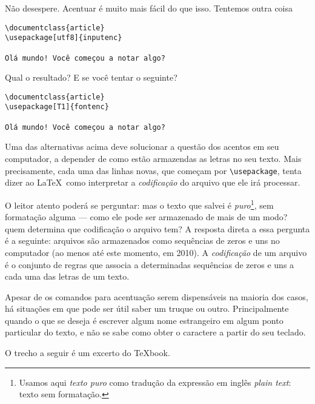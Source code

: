 Não desespere. Acentuar é muito mais fácil do que isso. Tentemos outra
coisa

\begin{footnotesize}
\begin{verbatim}
\documentclass{article}
\usepackage[utf8]{inputenc}

Olá mundo! Você começou a notar algo?

\end{verbatim}
\end{footnotesize}

Qual o resultado? E se você tentar o seguinte?
\begin{footnotesize}
\begin{verbatim}
\documentclass{article}
\usepackage[T1]{fontenc}

Olá mundo! Você começou a notar algo?

\end{verbatim}
\end{footnotesize}

Uma das alternativas acima deve solucionar a questão dos acentos em
seu computador, a depender de como estão armazendas as letras no
seu texto. Mais precisamente, cada uma das linhas novas, que começam
por \verb'\usepackage', tenta dizer ao \LaTeX\ como interpretar a
\emph{codificação} do arquivo que ele irá processar.

\begin{detalhe}
O leitor atento poderá se perguntar: mas o texto que salvei é
\emph{puro}\footnote{Usamos aqui \emph{texto puro} como tradução da
  expressão em inglês \emph{plain text}: texto sem formatação.}, sem
formatação alguma --- como ele pode ser armazenado de mais de um modo?
quem determina que codificação o arquivo tem? 
A resposta direta a essa pergunta é a seguinte: arquivos são
armazenados como sequências de zeros e uns no computador (ao menos até
este momento, em 2010). A \emph{codificação} de um arquivo é o
conjunto de regras que associa a determinadas sequências de zeros e
uns a cada uma das letras de um texto.
\end{detalhe}

Apesar de os comandos para acentuação serem dispensáveis na maioria
dos casos, há situações em que pode ser útil saber um truque ou
outro. Principalmente quando o que se deseja é escrever algum nome
estrangeiro em algum ponto particular do texto, e não se sabe como
obter o caractere a partir do seu teclado.

O trecho a seguir é um excerto do \TeX book.

